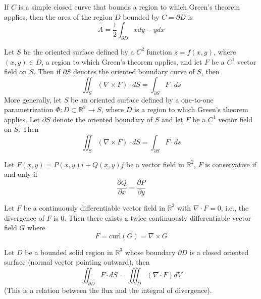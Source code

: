 \documentclass[openany]{book}
\newcommand{\curl}{\text{curl}}
\newcommand{\R}{\mathbb{R}}
\begin{document}
\begin{prop}
    If $C$ is a simple closed curve that bounds a region to which Green's theorem applies, then the area of the region $D$ bounded by $C=\partial D$ is 
    \begin{equation*}
        A=\frac{1}{2}\int_{\partial D}xdy-ydx
    \end{equation*}
\end{prop}


\begin{thm}
    Let $S$ be the oriented surface defined by a $C^2$ function $z=f(x,y)$, where $(x,y)\in D$, a region to which Green's theorem applies, and let $F$ be a $C^1$ vector field on $S$. Then if $\partial S$ denotes the oriented boundary curve of $S$, then 
    \begin{equation*}
        \iint_S(\nabla\times F)\cdot dS=\int_{\partial S}F\cdot ds
    \end{equation*}
    More generally, let $S$ be an oriented surface defined by a one-to-one parametrization $\Phi: D\subset\R^2\to S$, where $D$ is a region to which Green's theorem applies. Let $\partial S$ denote the oriented boundary of $S$ and let $F$ be a $C^1$ vector field on $S$. Then 
    \begin{equation*}
        \iint_S(\nabla\times F)\cdot dS=\int_{\partial S}F\cdot ds
    \end{equation*}
\end{thm}



\begin{prop}
    Let $F(x,y)=P(x,y)i+Q(x,y)j$ be a vector field in $\R^2$, $F$ is conservative if and only if 
    \begin{equation*}
        \frac{\partial Q}{\partial x}=\frac{\partial P}{\partial y}
    \end{equation*}
\end{prop}


\begin{prop}
    Let $F$ be a continuously differentiable vector field in $\R^3$ with $\nabla\cdot F=0$, i.e., the divergence of $F$ is $0$. Then there exists a twice continuously differentiable vector field $G$ where 
    \begin{equation*}
        F=\curl(G)=\nabla\times G
    \end{equation*}
\end{prop}


\begin{thm}
    Let $D$ be a bounded solid region in $\R^3$ whose boundary $\partial D$ is a closed oriented surface (normal vector pointing outward), then 
    \begin{equation*}
        \iint_{\partial D}F\cdot dS=\iiint_D(\nabla\cdot F)dV
    \end{equation*}
    (This is a relation between the flux and the integral of divergence).
\end{thm}
\end{document}
